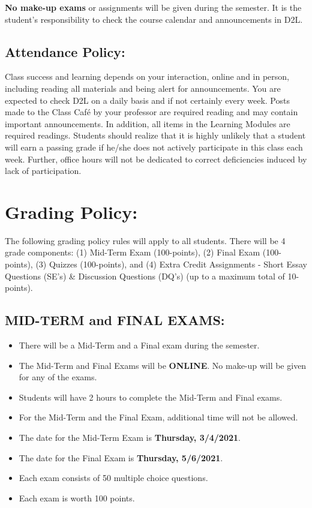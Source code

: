 \documentclass[11pt,]{article}
\providecommand{\tightlist}{%
  \setlength{\itemsep}{0pt}\setlength{\parskip}{0pt}}
\begin{document}
\textbf{No make-up exams} or assignments will be given during the semester. It is the student's responsibility to check the course calendar and announcements in D2L.

\hypertarget{attendance-policy}{%
\subsection{Attendance Policy:}\label{attendance-policy}}

Class success and learning depends on your interaction, online and in person,
including reading all materials and being alert for announcements. You are expected to check D2L
on a daily basis and if not certainly every week. Posts made to the Class Café by your professor are
required reading and may contain important announcements. In addition, all items in the Learning
Modules are required readings. Students should realize that it is highly unlikely that a student will
earn a passing grade if he/she does not actively participate in this class each week. Further, office
hours will not be dedicated to correct deficiencies induced by lack of participation.

\hypertarget{grading-policy}{%
\section{Grading Policy:}\label{grading-policy}}

The following grading policy rules will apply to all students.
There will be 4 grade components: (1) Mid-Term Exam (100-points), (2) Final Exam (100-points), (3)
Quizzes (100-points), and (4) Extra Credit Assignments - Short Essay Questions (SE's) \&
Discussion Questions (DQ's) (up to a maximum total of 10-points).

\hypertarget{mid-term-and-final-exams}{%
\subsection{MID-TERM and FINAL EXAMS:}\label{mid-term-and-final-exams}}

\begin{itemize}
\tightlist
\item
  There will be a Mid-Term and a Final exam during the semester.
\item
  The Mid-Term and Final Exams will be \textbf{ONLINE}. No make-up will be given for any of
  the exams.
\item
  Students will have 2 hours to complete the Mid-Term and Final exams.
\item
  For the Mid-Term and the Final Exam, additional time will not be allowed.
\item
  The date for the Mid-Term Exam is \textbf{Thursday, 3/4/2021}.
\item
  The date for the Final Exam is \textbf{Thursday, 5/6/2021}.
\item
  Each exam consists of 50 multiple choice questions.
\item
  Each exam is worth 100 points.
\end{itemize}
\end{document}
